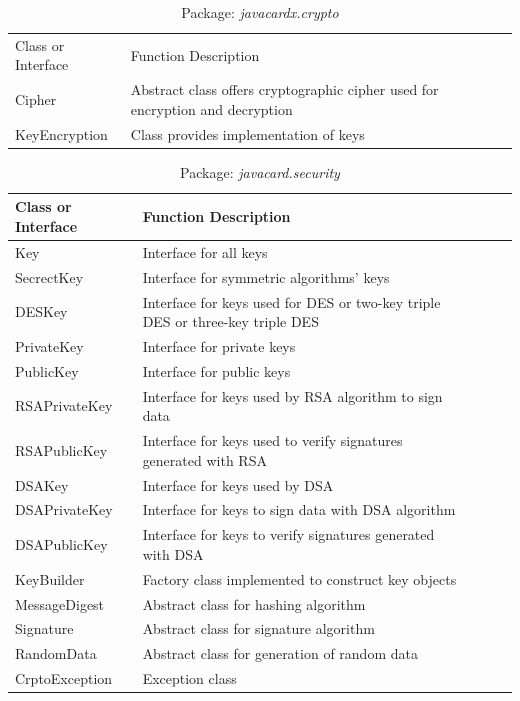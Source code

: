 \begin{table}[!htbp]
\caption{Package: \emph{javacardx.crypto}}
\begin{tabular}{lllll}
\hline\hline
Class or Interface & Function Description\\[0.5ex]
Cipher & \parbox[t]{10cm}{Abstract class offers cryptographic cipher used for encryption and decryption}\\
KeyEncryption & Class provides implementation of keys\\
\hline
\end{tabular}
\label{table:javacardx-crypto}
\end{table}


\begin{table}[ht]
\caption{Package: \emph{javacard.security}}
\centering
\begin{tabular}{lllll}
\hline
 Class or Interface & Function Description\\
\hline\hline
 Key &Interface for all keys   \\
 SecrectKey &Interface for symmetric algorithms' keys\\
DESKey & \parbox[t]{10cm}{Interface for keys used for DES or two-key triple DES or three-key triple DES}\\
PrivateKey &Interface for private keys\\
PublicKey & Interface for public keys\\
RSAPrivateKey& Interface for keys used by RSA algorithm to sign data\\
RSAPublicKey & Interface for keys used to verify signatures generated with RSA \\
DSAKey& Interface for keys used by DSA\\ 
DSAPrivateKey& Interface for keys to sign data with DSA algorithm\\
DSAPublicKey& Interface for keys to verify signatures generated with DSA\\
KeyBuilder& Factory class implemented to construct key objects\\
MessageDigest& Abstract class for hashing algorithm\\
Signature& Abstract class for signature algorithm\\
RandomData&Abstract class for generation of random data \\
CrptoException& Exception class\\
\hline
\end{tabular}
\label{table:javacard-security}
\end{table}

